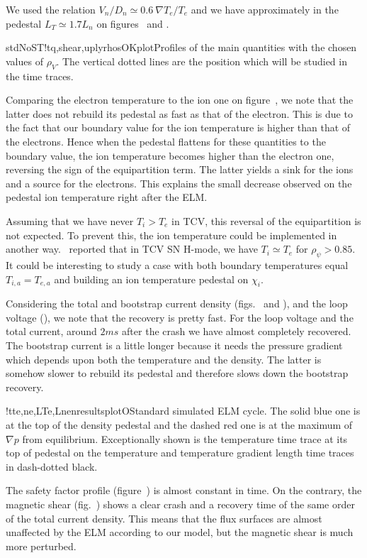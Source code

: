 We used the relation $V_n / D_n \simeq 0.6\ \nabla T_e / T_e$ and we have approximately in the pedestal $L_T \simeq 1.7 L_n$ on figures~ and .

\begin{AllFigs}{stdNoST}{!t}{}{q,shear,upl}{y}{rhosOKplot}{Profiles of the main quantities with the chosen values of $\rho_V$. The vertical dotted lines are the position which will be studied in the time traces.}
\end{AllFigs}
Comparing the electron temperature to the ion one on figure~, we note that the latter does not rebuild its pedestal as fast as that of the electron. This is due to the fact that our boundary value for the ion temperature is higher than that of the electrons. Hence when the pedestal flattens for these quantities to the boundary value, the ion temperature becomes higher than the electron one, reversing the sign of the equipartition term. The latter yields a sink for the ions and a source for the electrons. This explains the small decrease observed on the pedestal ion temperature right after the ELM.

Assuming that we have never $T_i > T_e$ in TCV, this reversal of the equipartition is not expected. To prevent this, the ion temperature could be implemented in another way. \cite{andreas2010}~reported that in TCV SN H-mode, we have $T_i \simeq T_e$ for $\rho_{\psi} > 0.85$. It could be interesting to study a case with both boundary temperatures equal $T_{i,a} = T_{e,a}$ and building an ion temperature pedestal on $\chi_i$.

Considering the total and bootstrap current density (figs.~ and ), and the loop voltage (), we note that the recovery is pretty fast. For the loop voltage and the total current, around $2ms$ after the crash we have almost completely recovered. The bootstrap current is a little longer because it needs the pressure gradient which depends upon both the temperature and the density. The latter is somehow slower to rebuild its pedestal and therefore slows down the bootstrap recovery.

\begin{AllFigs}{}{!t}{}{te,ne,LTe,Lne}{n}{resultsplotO}{Standard simulated ELM cycle. The solid blue one is at the top of the density pedestal and the dashed red one is at the maximum of $\nabla p$ from equilibrium. Exceptionally shown is the temperature time trace at its top of pedestal on the temperature and temperature gradient length time traces in dash-dotted black.}
\end{AllFigs}
The safety factor profile (figure~) is almost constant in time. On the contrary, the magnetic shear (fig.~) shows a clear crash and a recovery time of the same order of the total current density. This means that the flux surfaces are almost unaffected by the ELM according to our model, but the magnetic shear is much more perturbed.

